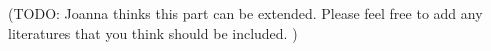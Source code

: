 %
%
%






%


(TODO: Joanna thinks this part can be extended. Please feel free to add any literatures that you think should be included. )
